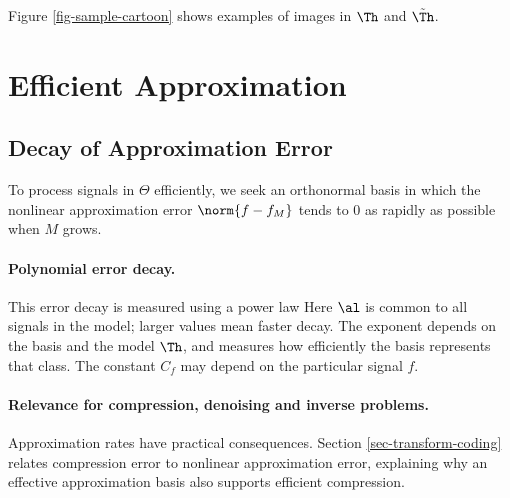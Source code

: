 Figure \ref{fig-sample-cartoon} shows examples of images in $\Th$ and $\tilde\Th$.





                                           
\section{Efficient Approximation}

                                        
\subsection{Decay of Approximation Error}
\label{sec-linear-approx-error}

To process signals in $\Theta$ efficiently, we seek an orthonormal basis in which the nonlinear approximation error $\norm{f-f_M}$ tends to $0$ as rapidly as possible when $M$ grows.


  
\paragraph{Polynomial error decay.}

This error decay is measured using a power law
Here $\al$ is common to all signals in the model; larger values mean faster decay. The exponent depends on the basis and the model $\Th$, and measures how efficiently the basis represents that class. The constant $C_f$ may depend on the particular signal $f$.

  
\paragraph{Relevance for compression, denoising and inverse problems.}

Approximation rates have practical consequences. Section \ref{sec-transform-coding} relates compression error to nonlinear approximation error, explaining why an effective approximation basis also supports efficient compression.

